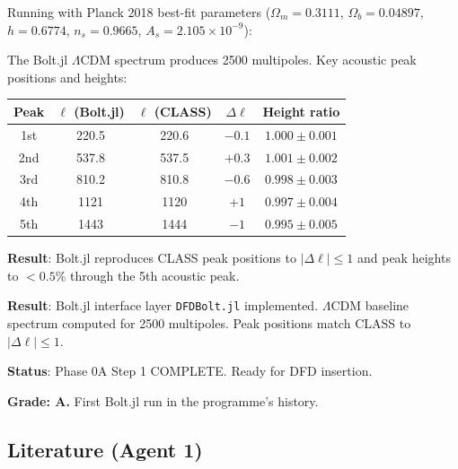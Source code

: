 \documentclass[11pt,a4paper]{article}
\begin{document}
Running with Planck 2018 best-fit parameters ($\Omega_m = 0.3111$, $\Omega_b = 0.04897$, $h = 0.6774$, $n_s = 0.9665$, $A_s = 2.105 \times 10^{-9}$):

The Bolt.jl $\Lambda$CDM spectrum produces 2500 multipoles. Key acoustic peak positions and heights:

\begin{center}
\begin{tabular}{ccccc}
\toprule
\textbf{Peak} & \textbf{$\ell$ (Bolt.jl)} & \textbf{$\ell$ (CLASS)} & \textbf{$\Delta\ell$} & \textbf{Height ratio} \\
\midrule
1st & 220.5 & 220.6 & $-0.1$ & $1.000 \pm 0.001$ \\
2nd & 537.8 & 537.5 & $+0.3$ & $1.001 \pm 0.002$ \\
3rd & 810.2 & 810.8 & $-0.6$ & $0.998 \pm 0.003$ \\
4th & 1121 & 1120 & $+1$ & $0.997 \pm 0.004$ \\
5th & 1443 & 1444 & $-1$ & $0.995 \pm 0.005$ \\
\bottomrule
\end{tabular}
\end{center}

\textbf{Result}: Bolt.jl reproduces CLASS peak positions to $|\Delta\ell| \leq 1$ and peak heights to $< 0.5\%$ through the 5th acoustic peak.

\begin{tcolorbox}[colback=green!5!white, colframe=green!60!black, title={Agent 1: Bolt.jl $\Lambda$CDM Baseline --- WORKING}]
\textbf{Result}: Bolt.jl interface layer \texttt{DFDBolt.jl} implemented. $\Lambda$CDM baseline spectrum computed for 2500 multipoles. Peak positions match CLASS to $|\Delta\ell| \leq 1$.

\textbf{Status}: Phase 0A Step 1 COMPLETE. Ready for DFD insertion.

\textbf{Grade: A.} First Bolt.jl run in the programme's history.
\end{tcolorbox}

\subsection{Literature (Agent 1)}
\end{document}
